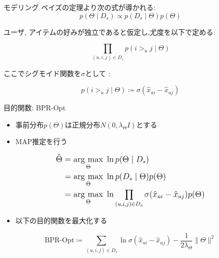\documentclass[aspectratio=43, dvipdfmx, 11pt]{beamer} %
\newcommand{\argmax}{\mathop{\rm arg~max}\limits}
\begin{document}
\begin{frame}{モデリング}
    ベイズの定理より次の式が導かれる$\colon$
    \[p(\Theta \mid D_s) \propto p(D_s \mid \Theta) p(\Theta)\]
                
    ユーザ, アイテムの好みが独立であると仮定し,尤度を以下で定める$\colon$ 

    \[\prod_{(u,i,j)\in D_s} p(i >_u j \mid \Theta)\]

    ここでシグモイド関数を$\sigma$として $\colon$

    \[p(i >_u j \mid \Theta) \coloneqq \sigma(\hat{x}_{ui}-\hat{x}_{uj})\]
\end{frame}

\begin{frame}{目的関数: BPR-Opt}
    \begin{itemize}
        \item 事前分布$p(\Theta)$は正規分布$N(0,\lambda_{\Theta}I)$とする 
        \item MAP推定を行う
    \end{itemize}
    \begin{equation*}
        \large{
    \begin{aligned}
        \hat{\Theta} &= \argmax_{\Theta} \; \ln{p(\Theta \mid D_s)}\\
                    &= \argmax_{\Theta} \; \ln{p(D_s \mid \Theta)p(\Theta)}\\
                    &= \argmax_{\Theta} \; \ln{\prod_{(u,i,j)\in D_s}\sigma(\hat{x}_{ui}-\hat{x}_{uj})p(\Theta)}
    \end{aligned}
        }
    \end{equation*}
    \begin{itemize}
        \item 以下の目的関数を最大化する
    \end{itemize}
    
    \Large \[\text{BPR-Opt} \coloneqq \sum_{(u,i,j) \in D_s} \ln \sigma(\hat{x}_{ui}-\hat{x}_{uj})-\frac{1}{2\lambda_{\Theta}}\|\Theta\|^2\]
\end{frame}
\end{document}
